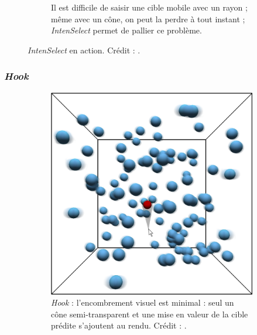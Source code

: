 \begin{appendices}
\begin{figure}[htbp]
\begin{subfigure}[t]{0.52\textwidth}
			\caption{Il est difficile de saisir une cible mobile avec un rayon ; même avec un cône, on peut la \og perdre \fg{} à tout instant ; \emph{IntenSelect} permet de pallier ce problème.}
			\label{fig:intenSnap2}
		\end{subfigure}
		\caption[\emph{IntenSelect}]{\emph{IntenSelect} en action. Crédit : \cite{de2005intenselect}.}
		\label{fig:intenSnap12}
	\end{figure}
	
	
	
	
	
	\subsubsection{\emph{Hook}}
	
	
	\begin{figure}[htbp]
		\begin{subfigure}{.29\textwidth}
			\centering
			\includegraphics[width=\textwidth]{figures/ch2/hookPic}
			\caption[\emph{Hook} -- fonctionnement]{\emph{Hook} : l'encombrement visuel est minimal : seul un cône semi-transparent et une mise en valeur de la cible prédite s'ajoutent au rendu. Crédit : \cite{ortega2013hook}.}
			\label{fig:hookPic}
		\end{subfigure}
		~
		\begin{subfigure}{.69\textwidth}

\end{subfigure}
\end{figure}
\end{appendices}
